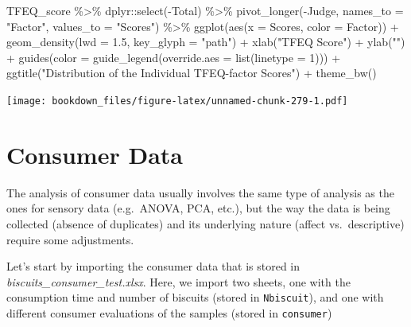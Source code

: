\documentclass[
]{krantz}
\makeatletter
\newenvironment{Shaded}{\begin{snugshade}}{\end{snugshade}}
\newcommand{\AttributeTok}[1]{\textcolor[rgb]{0.61,0.61,0.61}{#1}}
\newcommand{\DecValTok}[1]{\textcolor[rgb]{0.06,0.06,0.06}{#1}}
\newcommand{\FloatTok}[1]{\textcolor[rgb]{0.06,0.06,0.06}{#1}}
\newcommand{\FunctionTok}[1]{\textcolor[rgb]{0,0,0}{#1}}
\newcommand{\NormalTok}[1]{#1}
\newcommand{\SpecialCharTok}[1]{\textcolor[rgb]{0,0,0}{#1}}
\newcommand{\StringTok}[1]{\textcolor[rgb]{0.5,0.5,0.5}{#1}}
\newenvironment{kframe}{%
\medskip{}
\setlength{\fboxsep}{.8em}
 \def\at@end@of@kframe{}%
 \ifinner\ifhmode%
  \def\at@end@of@kframe{\end{minipage}}%
  \begin{minipage}{\columnwidth}%
 \fi\fi%
 \def\FrameCommand##1{\hskip\@totalleftmargin \hskip-\fboxsep
 \colorbox{shadecolor}{##1}\hskip-\fboxsep
     \hskip-\linewidth \hskip-\@totalleftmargin \hskip\columnwidth}%
 \MakeFramed {\advance\hsize-\width
   \@totalleftmargin\z@ \linewidth\hsize
   \@setminipage}}%
 {\par\unskip\endMakeFramed%
 \at@end@of@kframe}
\renewenvironment{Shaded}{\begin{kframe}}{\end{kframe}}
\makeatother
\begin{document}
\begin{Shaded}
\begin{Highlighting}[]
\NormalTok{TFEQ\_score }\SpecialCharTok{\%\textgreater{}\%}
\NormalTok{  dplyr}\SpecialCharTok{::}\FunctionTok{select}\NormalTok{(}\SpecialCharTok{{-}}\NormalTok{Total) }\SpecialCharTok{\%\textgreater{}\%}
  \FunctionTok{pivot\_longer}\NormalTok{(}\SpecialCharTok{{-}}\NormalTok{Judge, }\AttributeTok{names\_to =} \StringTok{"Factor"}\NormalTok{, }\AttributeTok{values\_to =} \StringTok{"Scores"}\NormalTok{) }\SpecialCharTok{\%\textgreater{}\%}
  \FunctionTok{ggplot}\NormalTok{(}\FunctionTok{aes}\NormalTok{(}\AttributeTok{x =}\NormalTok{ Scores, }\AttributeTok{color =}\NormalTok{ Factor)) }\SpecialCharTok{+}
  \FunctionTok{geom\_density}\NormalTok{(}\AttributeTok{lwd =} \FloatTok{1.5}\NormalTok{, }\AttributeTok{key\_glyph =} \StringTok{"path"}\NormalTok{) }\SpecialCharTok{+}
  \FunctionTok{xlab}\NormalTok{(}\StringTok{"TFEQ Score"}\NormalTok{) }\SpecialCharTok{+}
  \FunctionTok{ylab}\NormalTok{(}\StringTok{""}\NormalTok{) }\SpecialCharTok{+}
  \FunctionTok{guides}\NormalTok{(}\AttributeTok{color =} \FunctionTok{guide\_legend}\NormalTok{(}\AttributeTok{override.aes =} \FunctionTok{list}\NormalTok{(}\AttributeTok{linetype =} \DecValTok{1}\NormalTok{))) }\SpecialCharTok{+}
  \FunctionTok{ggtitle}\NormalTok{(}\StringTok{"Distribution of the Individual TFEQ{-}factor Scores"}\NormalTok{) }\SpecialCharTok{+}
  \FunctionTok{theme\_bw}\NormalTok{()}
\end{Highlighting}
\end{Shaded}

\texttt{[image: bookdown\_files/figure-latex/unnamed-chunk-279-1.pdf]}

\hypertarget{tibble-use}{%
\section{Consumer Data}\label{tibble-use}}

The analysis of consumer data usually involves the same type of analysis as the ones for sensory data (e.g.~ANOVA, PCA, etc.), but the way the data is being collected (absence of duplicates) and its underlying nature (affect vs.~descriptive) require some adjustments.

Let's start by importing the consumer data that is stored in \emph{biscuits\_consumer\_test.xlsx}. Here, we import two sheets, one with the consumption time and number of biscuits (stored in \texttt{Nbiscuit}), and one with different consumer evaluations of the samples (stored in \texttt{consumer})
\end{document}
